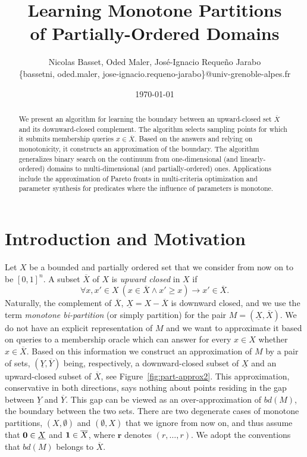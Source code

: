 \documentclass{llncs}%
\newcommand{\ul}[1]{{\underline{#1}}}
\renewcommand{\ov}[1]{{\overline{#1}}}
\newcommand{\uX}{\ul{X}}
\newcommand{\oX}{\ov{X}}
\newcommand{\uY}{\ul{Y}}
\newcommand{\oY}{\ov{Y}}
\begin{document}
\title{Learning Monotone Partitions \\ of Partially-Ordered Domains}

\author{Nicolas Basset, Oded Maler, Jos\'e-Ignacio Reque\~no Jarabo \\
      \{bassetni, oded.maler, jose-ignacio.requeno-jarabo\}@univ-grenoble-alpes.fr
}
\date{\today}
\maketitle

\begin{abstract}
We present an algorithm for  learning  the boundary between an upward-closed set  $\oX$ and its downward-closed  complement. The algorithm selects sampling points for which it submits membership queries $x\in \oX$. Based on the answers and relying on monotonicity, it constructs an approximation of the boundary. The algorithm generalizes binary search on the continuum from one-dimensional (and linearly-ordered) domains to multi-dimensional (and partially-ordered) ones.  Applications include the approximation of Pareto fronts in multi-criteria optimization and parameter synthesis for predicates where the influence of parameters is monotone.

\end{abstract}

\section{Introduction and Motivation}

Let $X$ be a bounded and partially ordered set that we consider from now on  to be $[0,1]^n$. A subset $\oX$ of $X$ is \emph{upward closed} in $X$ if
$$\forall x,x'\in X~(x \in \oX \wedge x'\geq x) \to x' \in \oX.$$ Naturally, the complement of $\oX$,   $\uX=X-\oX$ is downward closed, and we use the term \emph{monotone bi-partition} (or simply partition) for the pair $M=(\uX,\oX)$.   We do not have an explicit representation of $M$  and we want to approximate it based on queries to a membership oracle which can answer for every $x\in X$ whether $x\in \oX$. Based on this information we construct an approximation of $M$ by a pair of sets, $(\uY,\oY)$ being, respectively, a downward-closed subset of  $\uX$ and  an upward-closed subset of $ \oX$, see Figure~\ref{fig:part-approx2}. This approximation, conservative in both directions, says nothing about points residing  in the gap between $\uY$ and $\oY$. This gap can be viewed as an over-approximation of $bd(M)$, the boundary between the two sets. There are two degenerate cases of monotone partitions, $(X,\emptyset)$ and $(\emptyset,X)$ that we ignore from now on, and thus assume that $\vzer \in\uX$ and $\vi\in\oX$, where  $\mathbf{r}$ denotes $(r,\ldots,r)$. We adopt the conventions that $bd(M)$ belongs to $\oX$.
\end{document}
